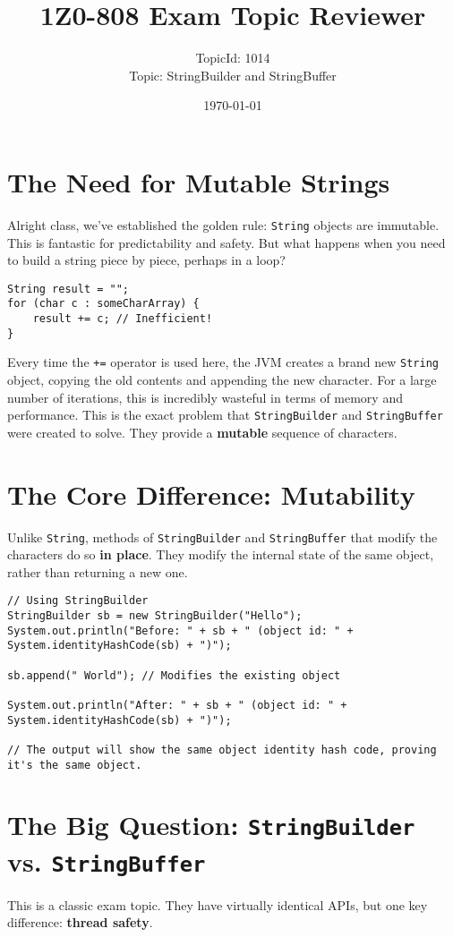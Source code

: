 \documentclass[12pt]{article}
\title{\textbf{1Z0-808 Exam Topic Reviewer}}
\author{TopicId: 1014 \\ Topic: StringBuilder and StringBuffer}
\date{\today}
\begin{document}
\maketitle
\newpage\begin{enumerate}[label=(\arabic*)]
\section*{The Need for Mutable Strings}
Alright class, we've established the golden rule: \texttt{String} objects are immutable. This is fantastic for predictability and safety. But what happens when you need to build a string piece by piece, perhaps in a loop? 
\begin{verbatim}
String result = "";
for (char c : someCharArray) {
    result += c; // Inefficient!
}
\end{verbatim}
Every time the \texttt{+=} operator is used here, the JVM creates a brand new \texttt{String} object, copying the old contents and appending the new character. For a large number of iterations, this is incredibly wasteful in terms of memory and performance. This is the exact problem that \texttt{StringBuilder} and \texttt{StringBuffer} were created to solve. They provide a \textbf{mutable} sequence of characters.

\section{The Core Difference: Mutability}
Unlike \texttt{String}, methods of \texttt{StringBuilder} and \texttt{StringBuffer} that modify the characters do so \textbf{in place}. They modify the internal state of the same object, rather than returning a new one.
\begin{verbatim}
// Using StringBuilder
StringBuilder sb = new StringBuilder("Hello");
System.out.println("Before: " + sb + " (object id: " + System.identityHashCode(sb) + ")");

sb.append(" World"); // Modifies the existing object

System.out.println("After: " + sb + " (object id: " + System.identityHashCode(sb) + ")");

// The output will show the same object identity hash code, proving it's the same object.
\end{verbatim}

\section{The Big Question: \texttt{StringBuilder} vs. \texttt{StringBuffer}}
This is a classic exam topic. They have virtually identical APIs, but one key difference: \textbf{thread safety}.


\end{enumerate}
\end{document}

